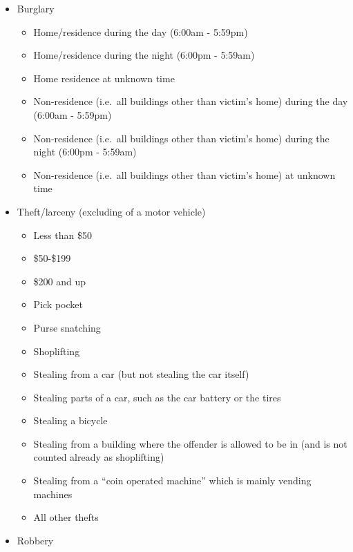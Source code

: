 \documentclass[
]{krantz}
\providecommand{\tightlist}{%
  \setlength{\itemsep}{0pt}\setlength{\parskip}{0pt}}
\begin{document}
\begin{itemize}
\tightlist
\item
  Burglary

  \begin{itemize}
  \tightlist
  \item
    Home/residence during the day (6:00am - 5:59pm)
  \item
    Home/residence during the night (6:00pm - 5:59am)
  \item
    Home residence at unknown time
  \item
    Non-residence (i.e.~all buildings other than victim's
    home) during the day (6:00am - 5:59pm)
  \item
    Non-residence (i.e.~all buildings other than victim's
    home) during the night (6:00pm - 5:59am)
  \item
    Non-residence (i.e.~all buildings other than victim's
    home) at unknown time
  \end{itemize}
\item
  Theft/larceny (excluding of a motor vehicle)

  \begin{itemize}
  \tightlist
  \item
    Less than \$50
  \item
    \$50-\$199
  \item
    \$200 and up
  \item
    Pick pocket
  \item
    Purse snatching
  \item
    Shoplifting
  \item
    Stealing from a car (but not stealing the car itself)
  \item
    Stealing parts of a car, such as the car battery or the
    tires
  \item
    Stealing a bicycle
  \item
    Stealing from a building where the offender is allowed
    to be in (and is not counted already as shoplifting)
  \item
    Stealing from a ``coin operated machine'' which is
    mainly vending machines
  \item
    All other thefts
  \end{itemize}
\item
  Robbery


\end{itemize}
\end{document}
